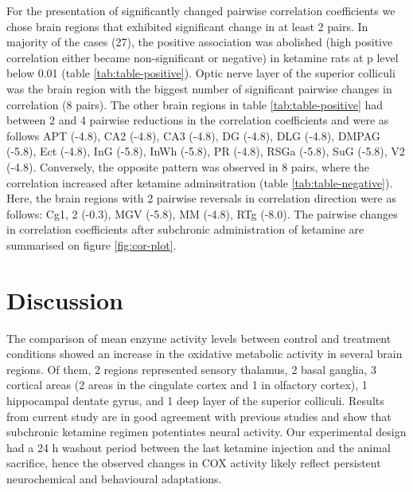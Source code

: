 \documentclass[man]{apa6}
\begin{document}
For the presentation of significantly changed pairwise correlation coefficients we chose brain regions that exhibited significant change in at least 2 pairs. In majority of the cases (27), the positive association was abolished (high positive correlation either became non-significant or negative) in ketamine rats at p level below 0.01 (table \ref{tab:table-positive}). Optic nerve layer of the superior colliculi was the brain region with the biggest number of significant pairwise changes in correlation (8 pairs). The other brain regions in table \ref{tab:table-positive} had between 2 and 4 pairwise reductions in the correlation coefficients and were as follows APT (-4.8), CA2 (-4.8), CA3 (-4.8), DG (-4.8), DLG (-4.8), DMPAG (-5.8), Ect (-4.8), InG (-5.8), InWh (-5.8), PR (-4.8), RSGa (-5.8), SuG (-5.8), V2 (-4.8). Conversely, the opposite pattern was observed in 8 pairs, where the correlation increased after ketamine adminsitration (table \ref{tab:table-negative}). Here, the brain regions with 2 pairwise reversals in correlation direction were as follows: Cg1, 2 (-0.3), MGV (-5.8), MM (-4.8), RTg (-8.0).
The pairwise changes in correlation coefficients after subchronic administration of ketamine are summarised on figure \ref{fig:cor-plot}.

\hypertarget{discussion}{%
\section{Discussion}\label{discussion}}

The comparison of mean enzyme activity levels between control and treatment conditions showed an increase in the oxidative metabolic activity in several brain regions. Of them, 2 regions represented sensory thalamus, 2 basal ganglia, 3 cortical areas (2 areas in the cingulate cortex and 1 in olfactory cortex), 1 hippocampal dentate gyrus, and 1 deep layer of the superior colliculi. Results from current study are in good agreement with previous studies and show that subchronic ketamine regimen potentiates neural activity. Our experimental design had a 24 h washout period between the last ketamine injection and the animal sacrifice, hence the observed changes in COX activity likely reflect persistent neurochemical and behavioural adaptations.
\end{document}
